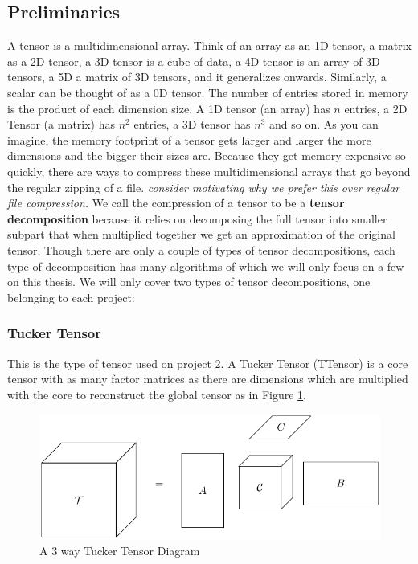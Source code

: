 \documentclass[MS]{wfuthesis}
\begin{document}
            \subsection{Preliminaries}
                A tensor is a multidimensional array. Think of an array as an 1D tensor, a matrix as a 2D tensor, a 3D tensor is a cube of data, a 4D tensor is an array of 3D tensors, a 5D a matrix of 3D tensors, and it generalizes onwards. Similarly, a scalar can be thought of as a 0D tensor. The number of entries stored in memory is the product of each dimension size. A 1D tensor (an array) has $n$ entries, a 2D Tensor (a matrix) has $n^2$ entries, a 3D tensor has $n^3$ and so on. As you can imagine, the memory footprint of a tensor gets larger and larger the more dimensions and the bigger their sizes are. Because they get memory expensive so quickly, there are ways to compress these multidimensional arrays that go beyond the regular zipping of a file. \textit{consider motivating why we prefer this over regular file compression.} We call the compression of a tensor to be a \textbf{tensor decomposition} because it relies on decomposing the full tensor into smaller subpart that when multiplied together we get an approximation of the original tensor. Though there are only a couple of types of tensor decompositions, each type of decomposition has many algorithms of which we will only focus on a few on this thesis. We will only cover two types of tensor decompositions, one belonging to each project:
                
                \subsubsection{Tucker Tensor}
                    This is the type of tensor used on project 2. A Tucker Tensor (TTensor) is a core tensor with as many factor matrices as there are dimensions which are multiplied with the core to reconstruct the global tensor as in Figure \ref{fig:TTensor_the}.
                    
                    \begin{figure}[ht]
                        \centering
                        \includegraphics[scale=1]{tikz/Tucker_Tensor.pdf}
                        \caption{A 3 way Tucker Tensor Diagram}
                        \label{fig:TTensor_the}
                    \end{figure}
\end{document}
